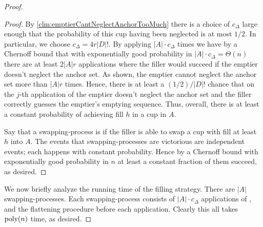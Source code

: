 \begin{proof}
\begin{proof}
  By \cref{clm:emptierCantNeglectAnchorTooMuch} there is a choice
  of $c_\Delta$ large enough that the probability of this cup
  having been neglected is at most $1/2$. In particular, we
  choose $c_\Delta = 4r|D|!$. By applying \randalg $|A|\cdot
  c_\Delta$ times we have by a Chernoff bound that with
  exponentially good probability in $|A|\cdot c_\Delta =
  \Theta(n)$ there are at least $2|A|r$ applications where the
  filler would succeed if the emptier doesn't neglect the anchor
  set. As shown, the emptier cannot
  neglect the anchor set more than $|A|r$ times. Hence, there
  is at least a $(1/2)/|D|!$ chance that on the $j$-th
  application of \randalg the emptier doesn't neglect the anchor
  set and the filler correctly guesses the emptier's emptying
  sequence. Thus, overall, there is at least a constant
  probability of achieving fill $h$ in a cup in $A$.

  Say that a swapping-process is  if the filler
  is able to swap a cup with fill at least $h$ into $A$. The
  events that swapping-processes are victorious are independent
  events; each happens with constant probability. Hence by a
  Chernoff bound with exponentially good probability in $n$ at
  least a constant fraction of them succeed, as desired.

\end{proof}

We now briefly analyze the running time of the filling strategy.
There are $|A|$ swapping-processes. Each swapping-process
consists of $|A|\cdot c_\Delta$ applications of \randalg, and
the flattening procedure before each application. 
Clearly this all takes $\operatorname{\text{poly}}(n)$ time, as desired.
  
\end{proof}

